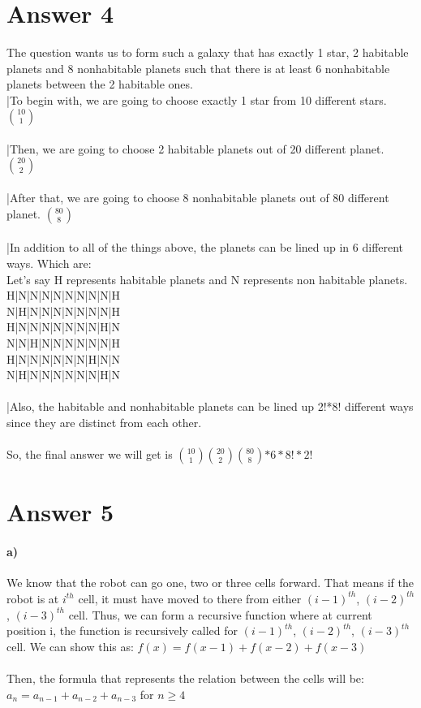 \documentclass[12pt]{article}
\begin{document}
\section*{Answer 4}
The question wants us to form such a galaxy that has exactly 1 star, 2 habitable planets and 8 nonhabitable planets such that there is at least 6 nonhabitable planets between the 2 habitable ones.\\
|To begin with, we are going to choose exactly 1 star from 10 different stars. $ {10}\choose {1}$\\
\\
|Then, we are going to choose 2 habitable planets out of 20 different planet. $ {20}\choose {2}$\\
\\
|After that, we are going to choose 8 nonhabitable planets out of 80 different planet. $ {80}\choose {8}$\\
\\
|In addition to all of the things above, the planets can be lined up in 6 different ways. Which are:\\
Let's say H represents habitable planets and N represents non habitable planets.\\
H|N|N|N|N|N|N|N|N|H   \\
N|H|N|N|N|N|N|N|N|H   \\
H|N|N|N|N|N|N|N|H|N   \\
N|N|H|N|N|N|N|N|N|H   \\
H|N|N|N|N|N|N|H|N|N   \\
N|H|N|N|N|N|N|N|H|N   \\
\\
|Also, the habitable and nonhabitable planets can be lined up 2!*8! different ways since they are distinct from each other.\\
\\
So, the final answer we will get is $ {10}\choose {1}$$ {20}\choose {2}$$ {80}\choose {8}$$ * 6 * 8! * 2!$\\

\section*{Answer 5}
\paragraph{a)}
We know that the robot can go one, two or three cells forward. That means if the robot is at $i^{th}$ cell, it must have moved to there from either $(i-1)^{th}$, $(i-2)^{th}$, $(i-3)^{th}$ cell. Thus, we can form a recursive function where at current position i, the function is recursively called for $(i-1)^{th}$, $(i-2)^{th}$, $(i-3)^{th}$ cell. We can show this as: $f(x) = f(x-1) + f(x-2) + f(x-3)$\\
\\
Then, the formula that represents the relation between the cells will be: $a_n = a_{n-1} + a_{n-2} + a_{n-3}$ for $n \geq 4$\\
\end{document}
